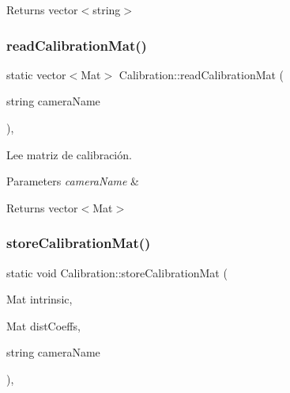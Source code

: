 \begin{DoxyReturn}{Returns}
vector$<$string$>$ 
\end{DoxyReturn}
\mbox{\label{classCalibration_a1700229db91e644ab02ace6e27c84a6a}} 
\subsubsection{\texorpdfstring{read\+Calibration\+Mat()}{readCalibrationMat()}}
{\footnotesize\ttfamily static vector$<$Mat$>$ Calibration\+::read\+Calibration\+Mat (\begin{DoxyParamCaption}\item[{string}]{camera\+Name }\end{DoxyParamCaption})\hspace{0.3cm}{\ttfamily [inline]}, {\ttfamily [static]}}



Lee matriz de calibración. 


\begin{DoxyParams}{Parameters}
{\em camera\+Name} & \\
\hline
\end{DoxyParams}
\begin{DoxyReturn}{Returns}
vector$<$\+Mat$>$ 
\end{DoxyReturn}
\mbox{\label{classCalibration_af14df4879d8b1c76ff2faa6ede59fc94}} 
\subsubsection{\texorpdfstring{store\+Calibration\+Mat()}{storeCalibrationMat()}}
{\footnotesize\ttfamily static void Calibration\+::store\+Calibration\+Mat (\begin{DoxyParamCaption}\item[{Mat}]{intrinsic,  }\item[{Mat}]{dist\+Coeffs,  }\item[{string}]{camera\+Name }\end{DoxyParamCaption})\hspace{0.3cm}{\ttfamily [inline]}, {\ttfamily [static]}}



